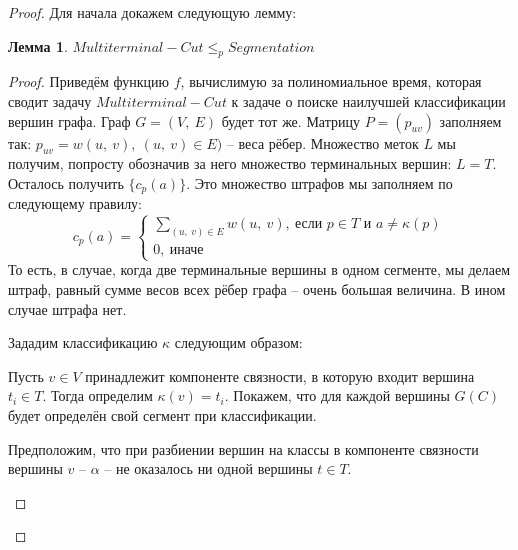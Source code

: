 \documentclass[a4paper,12pt]{article}
\newtheorem*{lemma}{Лемма}
\begin{document}
\begin{proof}
    Для начала докажем следующую лемму:
    \begin{lemma}
    $Multiterminal-Cut \leqslant_p Segmentation$
    \end{lemma}
    \begin{proof}
        Приведём функцию $f$, вычислимую за полиномиальное время, которая сводит задачу $Multiterminal-Cut$ к задаче о поиске наилучшей классификации вершин графа. Граф $G = (V,\ E)$ будет тот же. Матрицу $P = (p_{uv})$ заполняем так: $p_{uv} = w(u,\ v),\ (u,\ v) \in E)$ -- веса рёбер. Множество меток $L$ мы получим, попросту обозначив за него множество терминальных вершин: $L = T$. Осталось получить $\{c_p(a)\}$. Это множество штрафов мы заполняем по следующему правилу:
        \[c_p(a) = \begin{cases}\displaystyle\sum\limits_{(u,\ v) \in E}w(u,\ v),\ \text{если }p \in T \text{ и }a \neq \kappa(p)\\0,\ \text{иначе}\end{cases}\]
        То есть, в случае, когда две терминальные вершины в одном сегменте, мы делаем штраф, равный сумме весов всех рёбер графа -- очень большая величина. В ином случае штрафа нет.
        
        Зададим классификацию $\kappa$ следующим образом:
            
        Пусть $v \in V$ принадлежит компоненте связности, в которую входит вершина $t_i \in T$. Тогда определим $\kappa(v) = t_i$. Покажем, что для каждой вершины $G(C)$ будет определён свой сегмент при классификации.
            
        Предположим, что при разбиении вершин на классы в компоненте связности вершины $v$ -- $\alpha$ -- не оказалось ни одной вершины $t \in T$.
        \begin{center}
\end{center}
\end{proof}
\end{proof}
\end{document}
